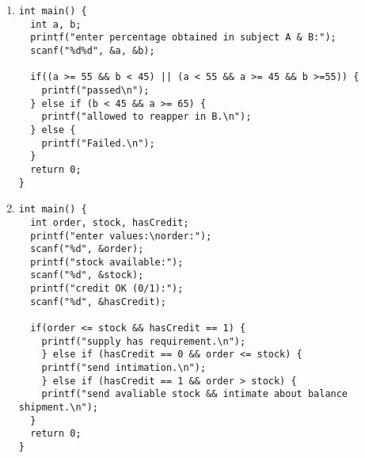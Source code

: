 \documentclass{report}
\begin{document}
\begin{enumerate}
\begin{verbatim}
  if(time >= 2 && time < 3) {
    printf("worker is highly efficient.\n");
  } else if (time >= 3 && time < 4) {
    printf("worker is ordered to increase speed.\n");
  } else if (time >= 4 && time < 5) {
    printf("worker needs to be given training.\n");
  } else if (time > 5) {
    printf("worker is asked to leave company.\n");
  }

  return 0;
}
  \end{verbatim}
\item \begin{verbatim}
int main() {
  int a, b;
  printf("enter percentage obtained in subject A & B:");
  scanf("%d%d", &a, &b);

  if((a >= 55 && b < 45) || (a < 55 && a >= 45 && b >=55)) {
    printf("passed\n");
  } else if (b < 45 && a >= 65) {
    printf("allowed to reapper in B.\n");
  } else {
    printf("Failed.\n");
  }
  return 0;
}
  \end{verbatim}
\item \begin{verbatim}
int main() {
  int order, stock, hasCredit;
  printf("enter values:\norder:");
  scanf("%d", &order);
  printf("stock available:");
  scanf("%d", &stock);
  printf("credit OK (0/1):");
  scanf("%d", &hasCredit);

  if(order <= stock && hasCredit == 1) {
    printf("supply has requirement.\n");
    } else if (hasCredit == 0 && order <= stock) {
    printf("send intimation.\n");
    } else if (hasCredit == 1 && order > stock) {
    printf("send avaliable stock && intimate about balance shipment.\n");
  }
  return 0;
}
  \end{verbatim}
\end{enumerate}
\end{document}
